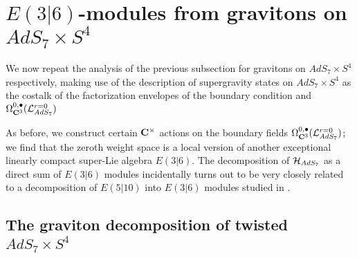 \documentclass[../main.tex]{subfiles}
\begin{document}
 

\section{$E(3|6)$-modules from gravitons on $AdS_7\times S^4$}\label{sec:e36}

We now repeat the analysis of the previous subsection for gravitons on $AdS_7\times S^4$ respectively, making use of the description of supergravity states on $AdS_7\times S^4$ as the costalk of the factorization envelopes of the boundary condition and $\Omega^{0,\bullet}_{\mathbf{C}^3} (\mathcal{L}^{{r=0}}_{AdS_7})$

As before, we construct certain $\mathbf{C}^\times$ actions on the boundary fields $\Omega^{0,\bullet}_{\mathbf{C}^3} (\mathcal{L}^{{r=0}}_{AdS_7})$; we find that the zeroth weight space is a local version of another exceptional linearly compact super-Lie algebra $E(3|6)$. The decomposition of $\mathcal{H}_{AdS_7}$ as a direct sum of $E(3|6)$ modules incidentally turns out to be very closely related to a decomposition of $E(5|10)$ into $E(3|6)$ modules studied in \cite{KacRudakov}.

\subsection{The graviton decomposition of twisted $AdS_7\times S^4$}

%
%
%
%
\end{document}

